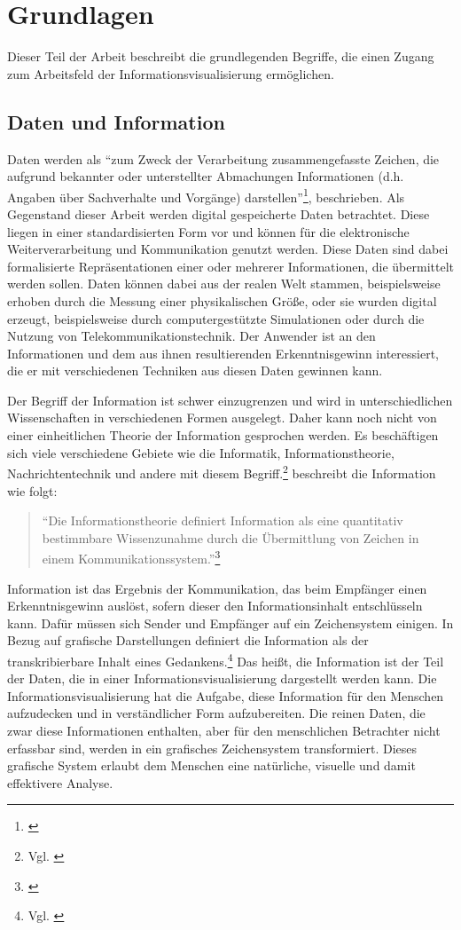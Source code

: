 \documentclass[a4paper, 
               12pt,
               DIV=calc,
               version=first,
               pdftex,
               headsepline,
               footsepline,
               bibliography=totocnumbered,
               listof=numbered]{scrreprt}
\begin{document}
\chapter{Grundlagen}
\label{cha:Grundlagen}
Dieser Teil der Arbeit beschreibt die grundlegenden Begriffe, die einen Zugang
zum Arbeitsfeld der Informationsvisualisierung ermöglichen.
\section{Daten und Information}
\label{sec:DatenInfo}
Daten werden als "`zum Zweck der Verarbeitung zusammengefasste Zeichen,
die aufgrund bekannter oder unterstellter Abmachungen
Informationen (d.h. Angaben über Sachverhalte und Vorgänge) darstellen"'\footnote{\citep{Gabler}}, beschrieben.
Als Gegenstand dieser Arbeit werden digital gespeicherte Daten betrachtet.
Diese liegen in einer standardisierten Form vor und können für die elektronische Weiterverarbeitung
und Kommunikation genutzt werden. Diese Daten sind dabei formalisierte Repräsentationen einer
oder mehrerer Informationen, die übermittelt werden sollen.
Daten können dabei aus der realen Welt stammen, beispielsweise erhoben durch
die Messung einer physikalischen Größe, oder sie wurden digital erzeugt, beispielsweise durch
computergestützte Simulationen oder durch die Nutzung von Telekommunikationstechnik.
Der Anwender ist an den Informationen und dem aus ihnen resultierenden Erkenntnisgewinn interessiert, die er mit verschiedenen
Techniken aus diesen Daten gewinnen kann.

Der Begriff der Information ist schwer einzugrenzen und wird in unterschiedlichen Wissenschaften
in verschiedenen Formen ausgelegt. Daher kann noch nicht von einer
einheitlichen Theorie der Information gesprochen werden. Es beschäftigen sich viele verschiedene
Gebiete wie die Informatik, Informationstheorie, Nachrichtentechnik und andere mit diesem
Begriff.\footnote{Vgl. \citep{wiki_info}} \cite{Hoeher} beschreibt die Information wie folgt:
\begin{quote}
"`Die Informationstheorie definiert Information als eine quantitativ bestimmbare Wissenzunahme durch
die Übermittlung von Zeichen in einem Kommunikationssystem."'\footnote{\citep[S.\,3]{Hoeher}}
\end{quote}
Information ist das Ergebnis der Kommunikation, das beim Empfänger einen Erkenntnisgewinn auslöst,
sofern dieser den Informationsinhalt entschlüsseln kann. Dafür müssen sich Sender und Empfänger
auf ein Zeichensystem einigen.
In Bezug auf grafische Darstellungen definiert \cite{Bertin} die Information als der transkribierbare
Inhalt eines Gedankens.\footnote{Vgl. \citep[S.\,13]{Bertin}} Das heißt, die Information ist der Teil der Daten, die in einer
Informationsvisualisierung dargestellt werden kann. Die Informationsvisualisierung hat die
Aufgabe, diese Information für den Menschen aufzudecken und in verständlicher Form aufzubereiten.
Die reinen Daten, die zwar diese Informationen enthalten,
aber für den menschlichen Betrachter nicht erfassbar sind, werden in ein grafisches
Zeichensystem transformiert. Dieses grafische System erlaubt dem Menschen eine natürliche, visuelle und
damit effektivere Analyse.
\end{document}
